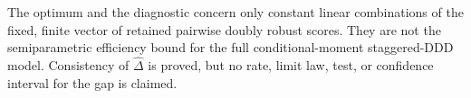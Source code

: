 The optimum and the diagnostic concern only constant linear combinations of the fixed, finite vector of retained pairwise doubly robust scores. They are not the semiparametric efficiency bound for the full conditional-moment staggered-DDD model. Consistency of \(\widehat\Delta\) is proved, but no rate, limit law, test, or confidence interval for the gap is claimed.
